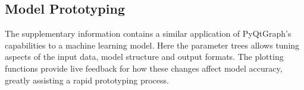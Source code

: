 \subsection{Model Prototyping}
The supplementary information contains a similar application of PyQtGraph's capabilities to a machine learning model. Here the parameter trees allows tuning aspects of the input data, model structure and output formats. The plotting functions provide live feedback for how these changes affect model accuracy, greatly assisting a rapid prototyping process.


